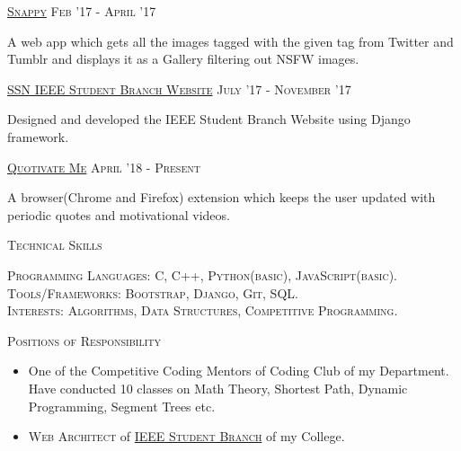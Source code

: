 \documentclass[11pt]{article}
\begin{document}
	\vspace{2mm}
	\large{\textsc{\href{https://chamow97.github.io/snappy/}{Snappy}}}   \hfill \small\textsc{Feb '17 - April '17}
	\begin{itemize}
	\small
	{
	\item A web app which gets all the images tagged with the given tag from Twitter and Tumblr and displays it as a Gallery filtering out NSFW images.
	}
	\end{itemize}	
	\vspace{2mm}
	\large{\textsc{\href{http://ssnieee.herokuapp.com/}{SSN IEEE Student Branch Website}}}   \hfill \small\textsc{July '17 - November '17}
	\begin{itemize}
	\small
	{
	\item Designed and developed the IEEE Student Branch Website using Django framework. 
	}
	\end{itemize}
	\vspace{2mm}
	\large{\textsc{\href{https://github.com/chamow97/Quotivate-Me/}{Quotivate Me}}}   \hfill \small\textsc{April '18 - Present}
	\begin{itemize}
	\small
	{
	\item A browser(Chrome and Firefox) extension which keeps the user updated with periodic quotes and motivational videos. 
	}
	\end{itemize}	
	\vspace{3mm}
	
		{\centering\Large{\textsc{Technical Skills}}\hrulefill}
	
	\vspace{3mm}

	\normalsize{
	\textsc{Programming Languages:} \textsc{C, C++, Python(basic), JavaScript(basic).} \\
	\textsc{Tools/Frameworks:} \textsc{Bootstrap, Django, Git, SQL.}
	}\\
	\textsc{Interests:} \textsc{Algorithms, Data Structures, Competitive Programming.}
			
	\vspace{11mm}
	{\centering\Large{\textsc{Positions of Responsibility}}	\hrulefill}
		
	\vspace{1mm}		
	\setlength\itemsep{-0.25em}
	\begin{normalsize}
	
	\begin{itemize}

	\item One of the Competitive Coding Mentors of Coding Club of my Department. Have conducted 10 classes on Math Theory, Shortest Path, Dynamic Programming, Segment Trees etc.
	\item \textsc{Web Architect} of \textsc{\href{https://github.com/SSN-IEEE}{IEEE Student Branch}} of my College.
	\end{itemize}	
	\end{normalsize}
\end{document}
